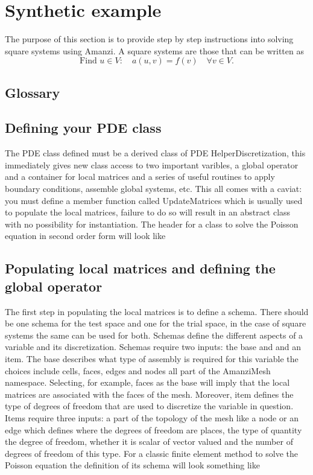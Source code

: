 \section{Synthetic example}
The purpose of this section is to provide step by step instructions into 
solving square systems using Amanzi.
A square systems are those that can be written as
$$
  \mbox{Find~} u \in V \colon \quad
  a(u, v) = f(v) \quad \forall  v \in V.
$$

\subsection{Glossary}

\subsection{Defining your PDE class}
The PDE class defined must be a derived class of PDE HelperDiscretization,
this immediately gives new class access to two important varibles, a global operator and a container for 
local matrices and a series of useful routines to apply boundary conditions, assemble global systems, etc.
This all comes with a caviat: you must define a member function called UpdateMatrices which is usually
used to populate the local matrices, failure to do so will result in an abstract class with no possibility for
instantiation.
The header for a class to solve the Poisson equation in second order form will look like

\subsection{Populating local matrices and defining the global operator}
The first step in populating the local matrices is to define a schema. There should be one schema for the test space and one for
the trial space, in the case of square systems the same can be used for both. Schemas define the different
aspects of a variable and its discretization. Schemas require two inputs: the base and and an item. The base
describes what type of assembly is required for this variable the choices include cells, faces, edges and nodes
all part of the AmanziMesh namespace. Selecting, for example, faces as the base will imply that the local
matrices are associated with the faces of the mesh. Moreover, item defines the type of degrees of freedom
that are used to discretize the variable in question. Items require three inputs: a part of the topology of the
mesh like a node or an edge which defines where the degrees of freedom are places, the type of quantity
the degree of freedom, whether it is scalar of vector valued and the number of degrees of freedom of this
type. For a classic finite element method to solve the Poisson equation the definition of its schema will look
something like



